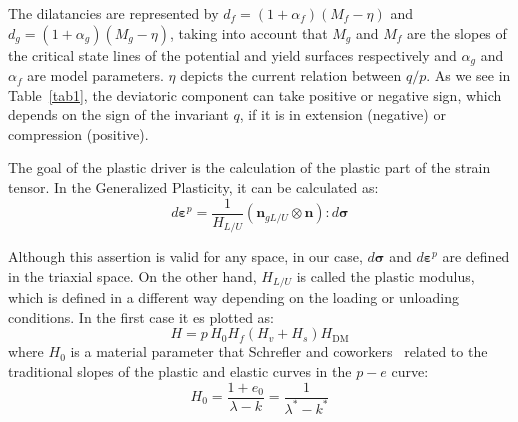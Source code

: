 \documentclass[preprint,12pt,a4paper]{elsarticle}
\begin{document}
The dilatancies are represented by $d_{f}=\left(1+\alpha_{f}\right)\left(M_{f}-\eta\right)$ and $d_{g}=\left(1+\alpha_{g}\right)\left(M_{g}-\eta\right)$, taking into account that $M_{g}$ and $M_{f}$ are the slopes of the critical state lines of the potential and yield surfaces respectively and $\alpha_{g}$ and $\alpha_{f}$ are model parameters. $\eta$ depicts the current relation between $q/p$. As we see in Table~\ref{tab1}, the deviatoric component can take positive or negative sign, which depends on the sign of the invariant $q$, if it is in extension (negative) or compression (positive).

The goal of the plastic driver is the calculation of the plastic part of the strain tensor. In the Generalized Plasticity, it can be calculated as:
\begin{equation}
d \boldsymbol{\varepsilon}^{p}=\frac{1}{H_{L / U}}\left(\mathbf{n}_{g L / U} \otimes \mathbf{n}\right) : d \boldsymbol{\sigma}
\end{equation}

Although this assertion is valid for any space, in our case, $d \boldsymbol{\sigma}$ and $d \boldsymbol{\varepsilon}^{p}$ are defined in the triaxial space. On the other hand, $H_{L / U}$ is called the plastic modulus, which is defined in a different way depending on the loading or unloading conditions. In the first case it es plotted as:
\begin{equation}
H=p\,H_{0}  H_{f}\left(H_{v}+H_{s}\right) H_{\mathrm{DM}}
\end{equation}
where $H_0$ is a material parameter that Schrefler and coworkers~\cite{Santagiuliana2006} related to the traditional slopes of the plastic and elastic curves in the $p-e$ curve:
\begin{equation}
H_{0}=\frac{1+e_{0}}{\lambda-k}=\frac{1}{\lambda^*-k^*}
\end{equation}
\end{document}
